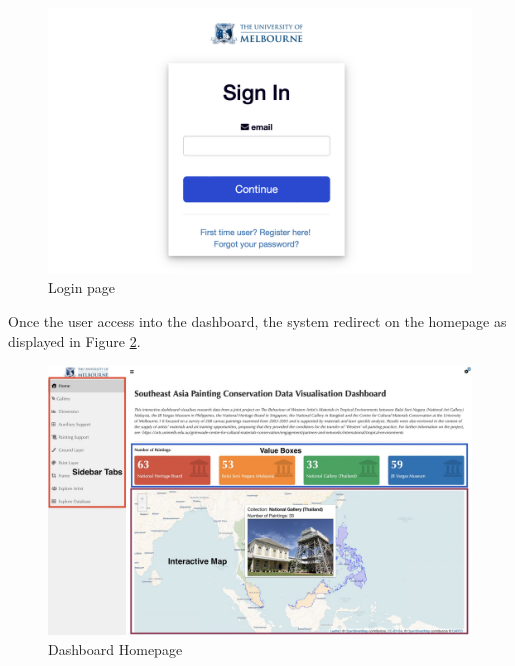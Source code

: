 \documentclass[11pt, oneside]{article}
\begin{document}
\begin{figure}[H]
    \centering
    \includegraphics[scale=0.5]{images/Polished_login.png}
    \caption{Login page}
    \label{Login_Homepage_2}
\end{figure}

\noindent Once the user access into the dashboard, the system redirect on the homepage as displayed in Figure \ref{dashboard_home_2}.

\begin{figure}[H]
    \centering
    \includegraphics[scale=0.25]{images/Dashboard Homepage Screenshot.png}
    \caption{Dashboard Homepage}
    \label{dashboard_home_2}
\end{figure}
\end{document}
